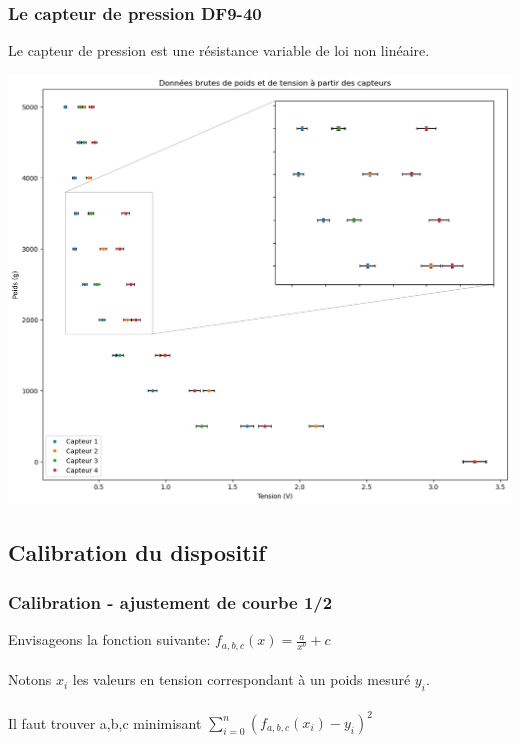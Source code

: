 \begin{frame}
    \frametitle{Le capteur de pression DF9-40}
    Le capteur de pression est une résistance variable de loi non linéaire.
    \begin{center}
        \includegraphics[scale=0.2]{./figures/cal_03.png}
    \end{center}
\end{frame}

\subsection{Calibration du dispositif}
\begin{frame}
    \frametitle{Calibration - ajustement de courbe 1/2}
    Envisageons la fonction suivante: $f_{a,b,c}(x) = \frac{a}{x^b}+c$\\
    \\
    Notons $x_i$ les valeurs en tension correspondant à un poids mesuré $y_i$.\\
    \\
    Il faut trouver a,b,c minimisant $ \sum_{i=0}^{n} (f_{a,b,c}(x_i)-y_i)^2$
\end{frame}


